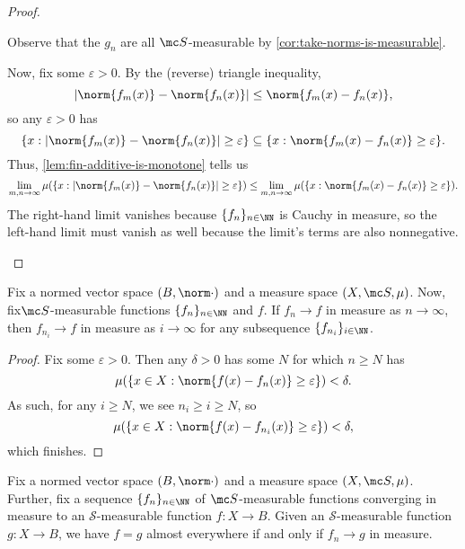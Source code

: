 \documentclass[../notes.tex]{subfiles}
\begin{document}
\begin{proof}
\begin{listalph}
		\item Observe that the $g_n$ are all $\mc S$-measurable by \autoref{cor:take-norms-is-measurable}.

		Now, fix some $\varepsilon>0$. By the (reverse) triangle inequality,
		\[|\norm{f_m(x)}-\norm{f_n(x)}|\le\norm{f_m(x)-f_n(x)},\]
		so any $\varepsilon>0$ has
		\[\{x:|\norm{f_m(x)}-\norm{f_n(x)}|\ge\varepsilon\}\subseteq\{x:\norm{f_m(x)-f_n(x)}\ge\varepsilon\}.\]
		Thus, \autoref{lem:fin-additive-is-monotone} tells us
		\[\lim_{m,n\to\infty}\mu(\{x:|\norm{f_m(x)}-\norm{f_n(x)}|\ge\varepsilon\})\le\lim_{m,n\to\infty}\mu(\{x:\norm{f_m(x)-f_n(x)}\ge\varepsilon\}).\]
		The right-hand limit vanishes because $\{f_n\}_{n\in\NN}$ is Cauchy in measure, so the left-hand limit must vanish as well because the limit's terms are also nonnegative.
		\qedhere
	\end{listalph}
\end{proof}
\begin{lemma} \label{lem:in-measure-subsequence}
	Fix a normed vector space $(B,\norm\cdot)$ and a measure space $(X,\mc S,\mu)$. Now, fix$\mc S$-measurable functions $\{f_n\}_{n\in\NN}$ and $f$. If $f_n\to f$ in measure as $n\to\infty$, then $f_{n_i}\to f$ in measure as $i\to\infty$ for any subsequence $\{f_{n_i}\}_{i\in\NN}$.
\end{lemma}
\begin{proof}
	Fix some $\varepsilon>0$. Then any $\delta>0$ has some $N$ for which $n\ge N$ has
	\[\mu(\{x\in X:\norm{f(x)-f_n(x)}\ge\varepsilon\})<\delta.\]
	As such, for any $i\ge N$, we see $n_i\ge i\ge N$, so
	\[\mu(\{x\in X:\norm{f(x)-f_{n_i}(x)}\ge\varepsilon\})<\delta,\]
	which finishes.
\end{proof}
\begin{lemma} \label{lem:uniq-limit-in-measure}
	Fix a normed vector space $(B,\norm\cdot)$ and a measure space $(X,\mc S,\mu)$. Further, fix a sequence $\{f_n\}_{n\in\NN}$ of $\mc S$-measurable functions converging in measure to an $\mathcal S$-measurable function $f\colon X\to B$. Given an $\mathcal S$-measurable function $g\colon X\to B$, we have $f=g$ almost everywhere if and only if $f_n\to g$ in measure.
\end{lemma}
\end{document}
